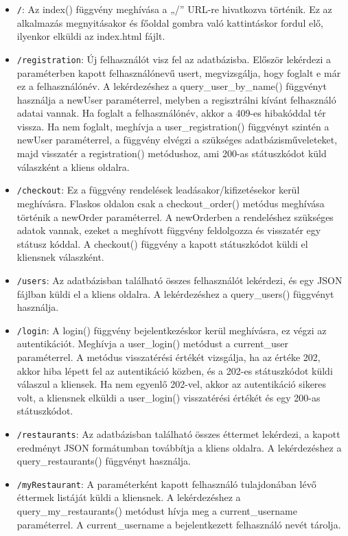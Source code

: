 \begin{itemize}
\item \texttt{/}:
Az index() függvény meghívása a „/” URL-re hivatkozva történik. Ez az alkalmazás megnyitásakor és főoldal gombra való kattintáskor fordul elő, ilyenkor elküldi az index.html fájlt.
\item \texttt{/registration}:
Új felhasználót visz fel az adatbázisba. Először lekérdezi a paraméterben kapott felhasználónevű usert, megvizsgálja, hogy foglalt e már ez a felhasználónév. A lekérdezéshez a query\_user\_by\_name() függvényt használja a newUser paraméterrel, melyben a regisztrálni kívánt felhasználó adatai vannak. Ha foglalt a felhasználónév, akkor a 409-es hibakóddal tér vissza. Ha nem foglalt, meghívja a user\_registration() függvényt szintén a newUser paraméterrel, a függvény elvégzi a szükséges adatbázisműveleteket, majd visszatér a registration() metódushoz, ami 200-as státuszkódot küld válaszként a kliens oldalra.
\item \texttt{/checkout}:
Ez a függvény rendelések leadásakor/kifizetésekor kerül meghívásra. Flaskos oldalon csak a checkout\_order() metódus meghívása történik a newOrder paraméterrel. A newOrderben a rendeléshez szükséges adatok vannak, ezeket a meghívott függvény feldolgozza és visszatér egy státusz kóddal. A checkout() függvény a kapott státuszkódot küldi el kliensnek válaszként.
\item \texttt{/users}:
Az adatbázisban található összes felhasználót lekérdezi, és egy JSON fájlban küldi el a kliens oldalra. A lekérdezéshez a query\_users() függvényt használja.
\item \texttt{/login}:
A login() függvény bejelentkezéskor kerül meghívásra, ez végzi az autentikációt. Meghívja a user\_login() metódust a current\_user paraméterrel. A metódus visszatérési értékét vizsgálja, ha az értéke 202, akkor hiba lépett fel az autentikáció közben, és a 202-es státuszkódot küldi válaszul a kliensek. Ha nem egyenlő 202-vel, akkor az autentikáció sikeres volt, a kliensnek elküldi a user\_login() visszatérési értékét és egy 200-as státuszkódot.
\item \texttt{/restaurants}:
Az adatbázisban található összes éttermet lekérdezi, a kapott eredményt JSON formátumban továbbítja a kliens oldalra. A lekérdezéshez a query\_restaurants() függvényt használja.
\item \texttt{/myRestaurant}:
A paraméterként kapott felhasználó tulajdonában lévő éttermek listáját küldi a kliensnek. A lekérdezéshez a query\_my\_restaurants() metódust hívja meg a current\_username paraméterrel. A current\_username a bejelentkezett felhasználó nevét tárolja.

\end{itemize}
